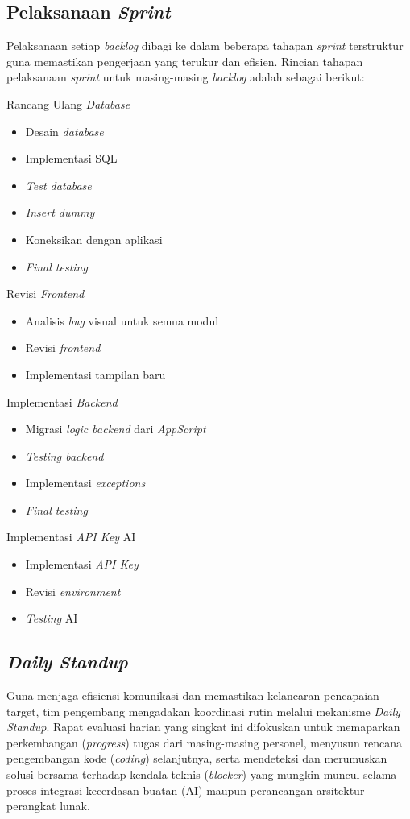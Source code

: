 \subsection{Pelaksanaan \textit{Sprint}}
Pelaksanaan setiap \textit{backlog} dibagi ke dalam beberapa tahapan \textit{sprint} terstruktur guna memastikan pengerjaan yang terukur dan efisien. Rincian tahapan pelaksanaan \textit{sprint} untuk masing-masing \textit{backlog} adalah sebagai berikut:

\noindent Rancang Ulang \textit{Database}
\begin{itemize}
    \item Desain \textit{database}
    \item Implementasi SQL
    \item \textit{Test database}
    \item \textit{Insert dummy}
    \item Koneksikan dengan aplikasi
    \item \textit{Final testing}
\end{itemize}

\noindent Revisi \textit{Frontend}
\begin{itemize}
    \item Analisis \textit{bug} visual untuk semua modul
    \item Revisi \textit{frontend}
    \item Implementasi tampilan baru
\end{itemize}

\noindent Implementasi \textit{Backend}
\begin{itemize}
    \item Migrasi \textit{logic backend} dari \textit{AppScript}
    \item \textit{Testing backend}
    \item Implementasi \textit{exceptions}
    \item \textit{Final testing}
\end{itemize}

\noindent Implementasi \textit{API Key} AI
\begin{itemize}
    \item Implementasi \textit{API Key}
    \item Revisi \textit{environment}
    \item \textit{Testing} AI
\end{itemize}

\subsection{\textit{Daily Standup}}
Guna menjaga efisiensi komunikasi dan memastikan kelancaran pencapaian target, tim pengembang mengadakan koordinasi rutin melalui mekanisme \textit{Daily Standup}. Rapat evaluasi harian yang singkat ini difokuskan untuk memaparkan perkembangan (\textit{progress}) tugas dari masing-masing personel, menyusun rencana pengembangan kode (\textit{coding}) selanjutnya, serta mendeteksi dan merumuskan solusi bersama terhadap kendala teknis (\textit{blocker}) yang mungkin muncul selama proses integrasi kecerdasan buatan (AI) maupun perancangan arsitektur perangkat lunak.

